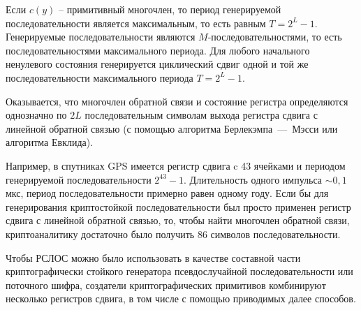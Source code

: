 Если $c(y)$ -- примитивный многочлен, то период генерируемой последовательности является максимальным, то есть равным $T = 2^{L} - 1$. Генерируемые последовательности являются $M$-последовательностями, то есть последовательностями максимального периода. Для любого начального ненулевого состояния генерируется циклический сдвиг одной и той же последовательности максимального периода $T=2^{L} - 1$.

Оказывается, что многочлен обратной связи и состояние регистра определяются однозначно по $2L$ последовательным символам выхода регистра сдвига с линейной обратной связью (с помощью алгоритма Берлекэмпа~---~Мэсси или алгоритма Евклида).

Например, в спутниках GPS имеется регистр сдвига c 43 ячейками и периодом генерируемой последовательности $2^{43} - 1$. Длительность одного импульса $\sim 0{,}1$ мкс, период последовательности примерно равен одному году. Если бы для генерирования криптостойкой последовательности был просто применен регистр сдвига с линейной обратной связью, то, чтобы найти многочлен обратной связи, криптоаналитику достаточно было получить 86 символов последовательности.

Чтобы РСЛОС можно было использовать в качестве составной части криптографически стойкого генератора псевдослучайной последовательности или поточного шифра, создатели криптографических примитивов комбинируют несколько регистров сдвига, в том числе с помощью приводимых далее способов.
